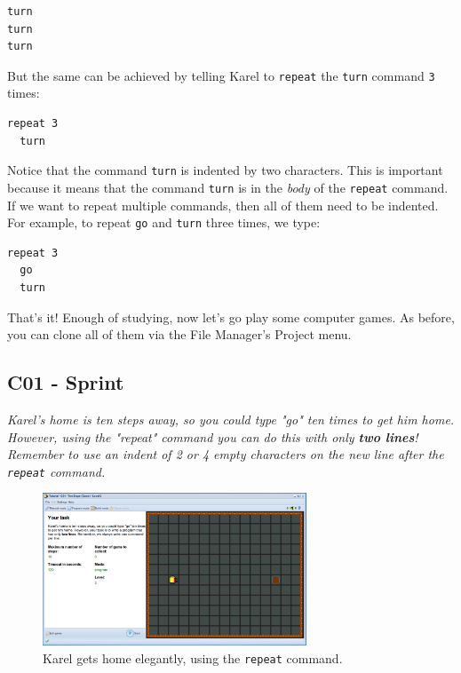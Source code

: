 \documentclass[article,A4,12pt]{llncs}
\begin{document}
\begin{verbatim}
turn
turn
turn
\end{verbatim}
But the same can be achieved by telling Karel to {\tt repeat} the {\tt turn} command {\tt 3} times:

\begin{verbatim}
repeat 3
  turn
\end{verbatim}
Notice that the command {\tt turn} is indented by two characters. This is important
because it means that the command {\tt turn} is in the {\em body} of the {\tt repeat} 
command. If we want to repeat multiple commands, then all of them need to be indented. 
For example, to repeat {\tt go} and {\tt turn} three times, we type:

\begin{verbatim}
repeat 3
  go
  turn
\end{verbatim}
That's it! Enough of studying, now let's go play some computer
games. As before, you can clone all of them via the File Manager's Project menu.

 
\subsection{C01 - Sprint}

{\em Karel's home is ten steps away, so you could type "go" ten times to get him home. However, using the "repeat" command you can do this with only {\bf two lines}! Remember to use an indent of 2 or 4 empty characters on the new line after the {\tt repeat} command.}

\begin{figure}[!ht]
\begin{center}
\includegraphics[width=0.7\textwidth]{img/c01.png}
\end{center}
\vspace{-4mm}
\caption{Karel gets home elegantly, using the {\tt repeat} command.}
\label{fig:c01}
\vspace{-4mm}
\end{figure}
\noindent
\end{document}
